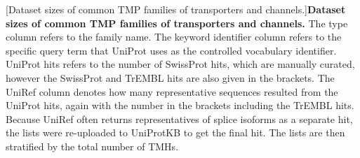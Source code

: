 \begin{table}[htbp]

  \centering
  [Dataset sizes of common TMP families of transporters and channels.]{\textbf{Dataset sizes of common TMP families of transporters and channels.}
  The type column refers to the family name.
  The keyword identifier column refers to the specific query term that UniProt uses as the controlled vocabulary identifier.
  UniProt hits refers to the number of SwissProt hits, which are manually curated, however the SwissProt and TrEMBL hits are also given in the brackets.
  The UniRef column denotes how many representative sequences resulted from the UniProt hits, again with the number in the brackets including the TrEMBL hits.
  Because UniRef often returns representatives of splice isoforms as a separate hit, the lists were re-uploaded to UniProtKB to get the final hit.
  The lists are then stratified by the total number of TMHs.
  }


\end{table}

